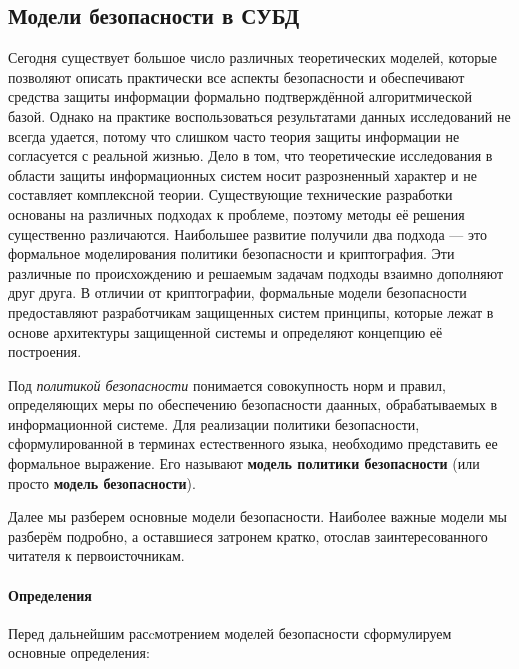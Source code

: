 \subsection{Модели безопасности в СУБД}
\label{subsec:security_models}
Сегодня существует большое число различных теоретических моделей, которые позволяют описать практически все аспекты безопасности и обеспечивают средства защиты информации формально подтверждённой алгоритмической базой. Однако на практике воспользоваться результатами данных исследований не всегда удается, потому что слишком часто теория защиты информации не согласуется с реальной жизнью. Дело в том, что теоретические исследования в области защиты информационных систем носит разрозненный характер и не составляет комплексной теории. Существующие технические разработки основаны на различных подходах к проблеме, поэтому методы её решения существенно различаются. Наибольшее развитие получили два подхода --- это формальное моделирования политики безопасности и криптография. Эти различные по происхождению и решаемым задачам подходы взаимно дополняют друг друга. В отличии от криптографии, формальные модели безопасности предоставляют разработчикам защищенных систем принципы, которые лежат в основе архитектуры защищенной системы и определяют концепцию её построения.

Под \textit{политикой безопасности} понимается совокупность норм и правил, определяющих меры по обеспечению безопасности даанных, обрабатываемых в информационной системе.  Для реализации политики безопасности, сформулированной в терминах естест­венного языка, необходимо представить ее формальное выражение.  Его называют \textbf{модель политики безопасности} (или просто \textbf{модель безопасности}).

Далее мы разберем основные модели безопасности. Наиболее важные модели мы разберём подробно, а оставшиеся затронем кратко,  отослав заинтересованного читателя к первоисточникам.

\paragraph{Определения}

Перед дальнейшим расcмотрением моделей безопасности сформулируем основные определения:

